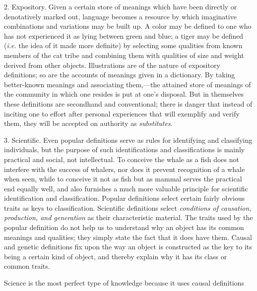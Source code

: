 \documentclass[showtrims,ustradepaper]{memoir}
\begin{document}

2. Expository. Given a certain store of meanings which have been
directly or denotatively marked out, language becomes a resource by
which imaginative combinations and variations may be built up. A color
may be defined to one who has not experienced it as lying between green
and blue; a tiger may be defined (\emph{i.e.} the idea of it made more
definite) by selecting some qualities from known members of the cat
tribe and combining them with qualities of size and weight derived from
other objects. Illustrations are of the nature of expository
definitions; so are the accounts of meanings given in a dictionary. By
taking better-known meanings and associating them,---the attained store
of meanings of the community in which one resides is put at one's
disposal. But in themselves these definitions are secondhand and
conventional; there is danger that instead of inciting one to effort
after personal experiences
that
will exemplify and verify them, they will be accepted on authority as
\emph{substitutes}.


3. Scientific. Even popular definitions serve as rules for identifying
and classifying individuals, but the purpose of such identifications and
classifications is mainly practical and social, not intellectual. To
conceive the whale as a fish does not interfere with the success of
whalers, nor does it prevent recognition of a whale when seen, while to
conceive it not as fish but as mammal serves the practical end equally
well, and also furnishes a much more valuable principle for scientific
identification and classification. Popular definitions select certain
fairly obvious traits as keys to classification. Scientific definitions
select \emph{conditions of causation, production, and generation} as
their characteristic material. The traits used by the popular definition
do not help us to understand why an object has its common meanings and
qualities; they simply state the fact that it does have them. Causal and
genetic definitions fix upon the way an object is constructed as the key
to its being a certain kind of object, and thereby explain why it has
its class or common traits.


Science is the most perfect type of knowledge because it uses causal
definitions
\end{document}

